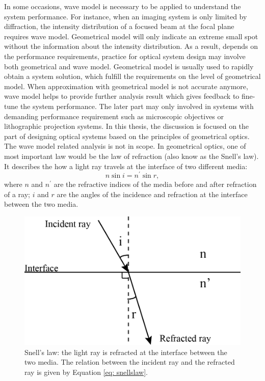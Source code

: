 
In some occasions, wave model is necessary to be applied to understand the system performance. For instance, when an imaging system is only limited by diffraction, the intensity distribution of a focused beam at the focal plane requires wave model. Geometrical model will only indicate an extreme small spot without the information about the intensity distribution. As a result, depends on the performance requirements, practice for optical system design may involve both geometrical and wave model. Geometrical model is usually used to rapidly obtain a system solution, which fulfill the requirements on the level of geometrical model. When approximation with geometrical model is not accurate anymore, wave model helps to provide further analysis result which gives feedback to fine-tune the system performance. The later part may only involved in systems with demanding performance requirement such as microscopic objectives or lithographic projection systems. In this thesis, the discussion is focused on the part of designing optical systems based on the principles of geometrical optics. The wave model related analysis is not in scope.  
%
In geometrical optics, one of most important law would be the law of refraction (also know as the Snell's law). It describes the how a light ray travels at the interface of two different media:
\begin{equation}
n \sin i = n^\prime \sin r,
\label{eq: snellslaw}
\end{equation}
where $n$ and $n^\prime$ are the refractive indices of the media before and after refraction of a ray; $i$ and $r$ are the angles of the incidence and refraction at the interface between the two media.
\begin{figure}
    \centering
    \includegraphics[scale=0.65]{chapter-1/figures/snellslaw.png}
    \caption{Snell's law: the light ray is refracted at the interface between the two media. The relation between the incident ray and the refracted ray is given by Equation \ref{eq: snellslaw}.}
    \label{fig: snellslaw}
\end{figure} 

